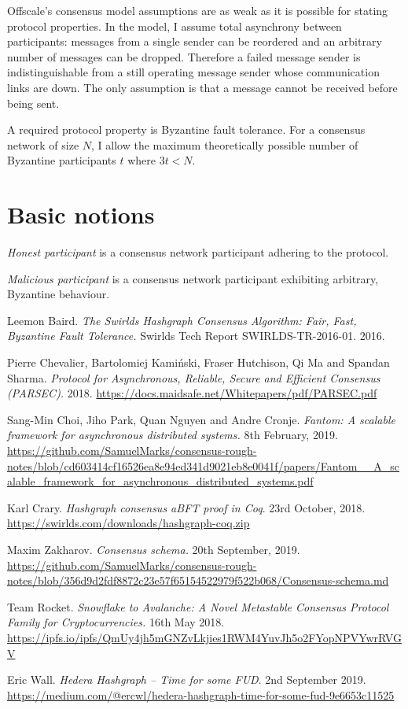 \documentclass[a4paper,11pt]{article}
\begin{document}
Offscale's consensus model assumptions are as weak as it is possible for stating protocol
properties. In the model, I assume total asynchrony between participants: messages from a single
sender can be reordered and an arbitrary number of messages can be dropped. Therefore a failed
message sender is indistinguishable from a still operating message sender whose communication links
are down. The only assumption is that a message cannot be received before being sent.

A required protocol property is Byzantine fault tolerance. For a consensus network of size $N$, I
allow the maximum theoretically possible number of Byzantine participants $t$ where $3t < N$.


\section{Basic notions}

\emph{Honest participant} is a consensus network participant adhering to the protocol.

\emph{Malicious participant} is a consensus network participant exhibiting arbitrary, Byzantine behaviour.


\begin{thebibliography}{10}

   Leemon Baird. \emph{The Swirlds Hashgraph Consensus Algorithm: Fair, Fast,
    Byzantine Fault Tolerance.} Swirlds Tech Report SWIRLDS-TR-2016-01. 2016.

   Pierre Chevalier, Bartolomiej Kamiński, Fraser Hutchison, Qi Ma and Spandan
    Sharma. \emph{Protocol for Asynchronous, Reliable, Secure and Efficient Consensus (PARSEC).}
    2018. \url{https://docs.maidsafe.net/Whitepapers/pdf/PARSEC.pdf}

   Sang-Min Choi, Jiho Park, Quan Nguyen and Andre Cronje. \emph{Fantom: A
    scalable framework for asynchronous distributed systems.} 8th February, 2019.
    \url{https://github.com/SamuelMarks/consensus-rough-notes/blob/cd603414cf16526ea8e94ed341d9021eb8e0041f/papers/Fantom__A_scalable_framework_for_asynchronous_distributed_systems.pdf}

   Karl Crary. \emph{Hashgraph consensus aBFT proof in Coq}. 23rd October,
    2018. \url{https://swirlds.com/downloads/hashgraph-coq.zip}

   Maxim Zakharov. \emph{Consensus schema.} 20th September,
    2019. \url{https://github.com/SamuelMarks/consensus-rough-notes/blob/356d9d2fdf8872c23e57f65154522979f522b068/Consensus-schema.md}

   Team Rocket. \emph{Snowflake to Avalanche: A Novel Metastable Consensus
    Protocol Family for Cryptocurrencies.} 16th May
    2018. \url{https://ipfs.io/ipfs/QmUy4jh5mGNZvLkjies1RWM4YuvJh5o2FYopNPVYwrRVGV}

   Eric Wall. \emph{Hedera Hashgraph -- Time for some FUD}. 2nd September
    2019.  \url{https://medium.com/@ercwl/hedera-hashgraph-time-for-some-fud-9e6653c11525}

\end{thebibliography}
\end{document}
